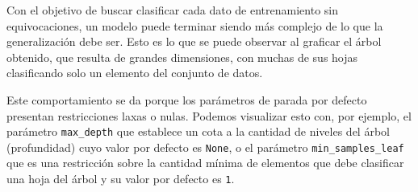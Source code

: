 \documentclass{article}
\begin{document}
Con el objetivo de buscar clasificar cada dato de entrenamiento sin equivocaciones, un modelo puede terminar siendo más complejo de lo que la generalización debe ser. Esto es lo que se puede observar al graficar el árbol obtenido, que resulta de grandes dimensiones, con muchas de sus hojas clasificando solo un elemento del conjunto de datos.

Este comportamiento se da porque los parámetros de parada por defecto presentan restricciones laxas o nulas. Podemos visualizar esto con, por ejemplo, el parámetro \verb|max_depth| que establece un cota a la cantidad de niveles del árbol (profundidad) cuyo valor por defecto es \verb|None|, o el parámetro \verb|min_samples_leaf| que es una restricción sobre la cantidad mínima de elementos que debe clasificar una hoja del árbol y su valor por defecto es \verb|1|.
\end{document}
